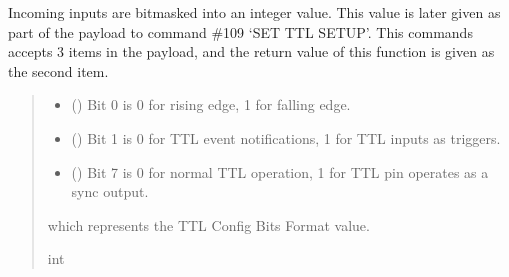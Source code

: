 \documentclass[letterpaper,10pt,english]{sphinxmanual}
\begin{document}
\begin{fulllineitems}
\begin{fulllineitems}
\label{\detokenize{PodDevice_8480SC:PodDevice_8480SC.POD_8480SC.TtlConfigBits}}
\pysigstartsignatures
{}
\pysigstopsignatures
\sphinxAtStartPar
Incoming inputs are bitmasked into an integer value. This value is later given as part of the payload to         command \#109 ‘SET TTL SETUP’. This commands accepts 3 items in the payload, and the return value of this function         is given as the second item.
\begin{quote}\begin{description}
\begin{itemize}
\item {} 
\sphinxAtStartPar
{} () \textendash{} Bit 0 is 0 for rising edge, 1 for falling edge.

\item {} 
\sphinxAtStartPar
{} () \textendash{} Bit 1 is  0 for TTL event notifications, 1 for TTL inputs as triggers.

\item {} 
\sphinxAtStartPar
{} () \textendash{} Bit 7 is 0 for normal TTL operation, 1 for TTL pin operates as a sync output.

\end{itemize}

\sphinxAtStartPar
which represents the TTL Config Bits Format value.

\sphinxAtStartPar
int

\end{description}\end{quote}

\end{fulllineitems}


\end{fulllineitems}
\end{document}
